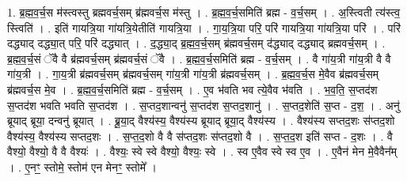 \documentclass[17pt]{extarticle}
\begin{document}
1. ब्र॒ह्म॒व॒र्च॒स म॑स्त्वस्तु ब्रह्मवर्च॒सम् ब्र॑ह्मवर्च॒स म॑स्तु । . ब्र॒ह्म॒व॒र्च॒समिति॑ ब्रह्म - व॒र्च॒सम् । . अ॒स्त्विती त्य॑स्त्व॒ स्त्विति॑ । . इति॑ गायत्रि॒या गा॑यत्रि॒येतीति॑ गायत्रि॒या । . गा॒य॒त्रि॒या परि॒ परि॑ गायत्रि॒या गा॑यत्रि॒या परि॑ । . परि॑ दद्ध्याद् दद्ध्या॒त् परि॒ परि॑ दद्ध्यात् । . द॒द्ध्या॒द् ब्र॒ह्म॒व॒र्च॒सम् ब्र॑ह्मवर्च॒सम् द॑द्ध्याद् दद्ध्याद् ब्रह्मवर्च॒सम् । . ब्र॒ह्म॒व॒र्च॒सं ॅवै वै ब्र॑ह्मवर्च॒सम् ब्र॑ह्मवर्च॒सं ॅवै । . ब्र॒ह्म॒व॒र्च॒समिति॑ ब्रह्म - व॒र्च॒सम् । . वै गा॑य॒त्री गा॑य॒त्री वै वै गा॑य॒त्री । . गा॒य॒त्री ब्र॑ह्मवर्च॒सम् ब्र॑ह्मवर्च॒सम् गा॑य॒त्री गा॑य॒त्री ब्र॑ह्मवर्च॒सम् । . ब्र॒ह्म॒व॒र्च॒स मे॒वैव ब्र॑ह्मवर्च॒सम् ब्र॑ह्मवर्च॒स मे॒व । . ब्र॒ह्म॒व॒र्च॒समिति॑ ब्रह्म - व॒र्च॒सम् । . ए॒व भ॑वति भव त्ये॒वैव भ॑वति । . भ॒व॒ति॒ स॒प्तद॑श स॒प्तद॑श भवति भवति स॒प्तद॑श । . स॒प्तद॒शान्वनु॑ स॒प्तद॑श स॒प्तद॒शानु॑ । . स॒प्तद॒शेति॑ स॒प्त - द॒श॒ । . अनु॑ ब्रूयाद् ब्रूया॒ दन्वनु॑ ब्रूयात् । . ब्रू॒या॒द् वैश्य॑स्य॒ वैश्य॑स्य ब्रूयाद् ब्रूया॒द् वैश्य॑स्य । . वैश्य॑स्य सप्तद॒शः स॑प्तद॒शो वैश्य॑स्य॒ वैश्य॑स्य सप्तद॒शः । . स॒प्त॒द॒शो वै वै स॑प्तद॒शः स॑प्तद॒शो वै । . स॒प्त॒द॒श इति॑ सप्त - द॒शः । . वै वैश्यो॒ वैश्यो॒ वै वै वैश्यः॑ । . वैश्यः॒ स्वे स्वे वैश्यो॒ वैश्यः॒ स्वे । . स्व ए॒वैव स्वे स्व ए॒व । . ए॒वैन॑ मेन मे॒वैवैन᳚म् । . ए॒नꣳ॒॒ स्तोमे॒ स्तोम॑ एन मेनꣳ॒॒ स्तोमे᳚ । \newline
\end{document}

